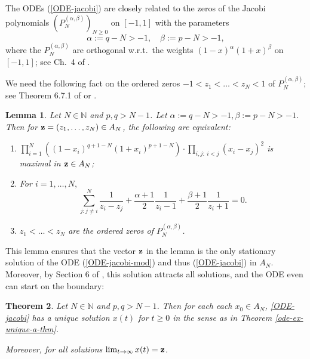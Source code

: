 \documentclass[reqno]{amsart}
\theoremstyle{plain}
\newtheorem{theorem}{Theorem}[section]
\newtheorem{lemma}[theorem]{Lemma}
\theoremstyle{definition}
\numberwithin{equation}{section}
\begin{document}
The ODEs (\ref{ODE-jacobi})  are closely related to the zeros of the
  Jacobi polynomials
$(P_N^{(\alpha,\beta)})_{N\ge 0}$ on $[-1,1]$ with the parameters
$$\alpha:=q-N>-1, \quad \beta:=p-N>-1,$$
where the $P_N^{(\alpha,\beta)}$ are orthogonal 
 w.r.t.~the weights $(1-x)^\alpha(1+x)^\beta$ on $[-1,1]$; see Ch.~4 of  \cite{S}.
  
We  need the following  fact on the ordered zeros 
$-1<z_1< \ldots< z_N<1$ of  $P_N^{(\alpha,\beta)}$; see Theorem 6.7.1 of \cite{S} or \cite{HV}.


\begin{lemma}\label{char-zero-jacobi}
  Let  $N\in\mathbb{N}$ and $p,q> N-1$. Let $\alpha:=q-N>-1, \beta:=p-N>-1$. Then
 for $ {\bf z}=(z_1,\ldots,z_N)\in A_N$, the following  are equivalent:
\begin{enumerate}
\item[\rm{(1)}]$\prod_{i=1}^N((1-x_i)^{q+1-N} (1+x_i)^{p+1-N}) \cdot\prod_{i,j: \> i<j} (x_i-x_j)^2$
 is maximal in $ {\bf z}\in A_N$;
\item[\rm{(2)}] For $i=1,\ldots,N,$
  \begin{equation}
          \sum_{j: j\neq i}^{N}\frac{1}{z_i-z_j}+\frac{\alpha+1}{2}\frac{1}{z_i-1}+\frac{\beta+1}{2}\frac{1}{z_i+1}=0.
          	\end{equation}
\item[\rm{(3)}] $z_{1}<\ldots< z_{N}$ are
  the ordered zeros  of  $P_N^{(\alpha,\beta)}$.
\end{enumerate}
\end{lemma}

This lemma ensures that the vector $ {\bf z}$ in the lemma is the only stationary solution of the ODE (\ref{ODE-jacobi-mod}) and thus (\ref{ODE-jacobi})
in $A_N$.
Moreover, by Section 6 of \cite{AVW}, this solution attracts all solutions, and  the ODE even can start on the boundary:

  \begin{theorem}\label{main-solutions-ode-jacobi}
          Let $N\in\mathbb{N}$ and $p,q> N-1$. Then for each
		 each $x_0\in A_N$, \eqref{ODE-jacobi} has a unique 
		 solution $x(t)$ for  $t\geq0$ in the sense as in Theorem \ref{ode-ex-unique-a-thm}.
                  
		Moreover, for all solutions
		$\lim_{t\to\infty}x(t)= {\bf z}$.
  \end{theorem}
\end{document}
